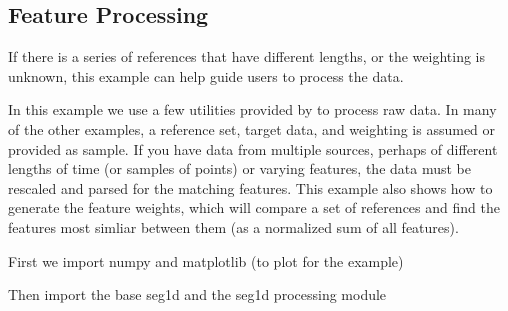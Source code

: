 \documentclass[letterpaper,10pt,english]{sphinxmanual}
\begin{document}
\begin{figure}[htbp]
\centering

\noindent{}
\end{figure}


\subsection{Feature Processing}
\label{\detokenize{api_processing:feature-processing}}\label{\detokenize{api_processing::doc}}
\sphinxAtStartPar
If there is a series of references that have different lengths, or the weighting is unknown,
this example can help guide users to process the data.

\label{\detokenize{api_processing:module-seg1d.examples.ex_feature_processing}}
\sphinxAtStartPar
In this example we use a few utilities provided by {\hyperref[\detokenize{code:module-seg1d}]{}} to process raw data. 
In many of the other examples, a reference set, target data, and weighting is assumed
or provided as sample.  If you have data from multiple sources, perhaps of different lengths of time
(or samples of points) or varying features, the data must be rescaled and parsed for the matching features.
This example also shows how to generate the feature weights, which will compare a set of references and find
the features most simliar between them (as a normalized sum of all features).

\sphinxAtStartPar
First we import numpy and matplotlib (to plot for the example)

\begin{sphinxVerbatim}[commandchars=\\\{\}]
   
   
\end{sphinxVerbatim}

\sphinxAtStartPar
Then import the base seg1d and the seg1d processing module

\begin{sphinxVerbatim}[commandchars=\\\{\}]
 
   
\end{sphinxVerbatim}
\end{document}
